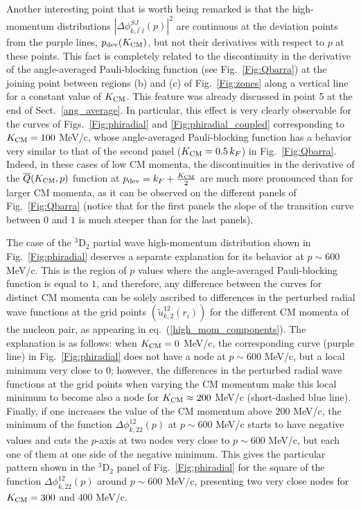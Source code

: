 \documentclass[aps,twocolumn,showpacs,preprintnumbers,amsmath,amssymb,nofootinbib,superscriptaddress,showkeys,noeprint]{revtex4-1}
\begin{document}
Another interesting point that is worth being remarked is that the
high-momentum distributions $\left| \Delta\phi^{SJ}_{k, l^\prime\,
  l}(p) \right|^2$ are continuous at the deviation points from the
purple lines, $p_{\rm dev}(K_{\rm CM})$, but not their derivatives
with respect to $p$ at these points. This fact is completely related
to the discontinuity in the derivative of the angle-averaged
Pauli-blocking function (see Fig.~\ref{Fig:Qbarra}) at the joining
point between regions (b) and (c) of Fig.~\ref{Fig:zones} along a
vertical line for a constant value of $K_{\rm CM}$. This feature was
already discussed in point 5 at the end of Sect.~\ref{ang_average}.
In particular, this effect is very clearly observable for the curves
of Figs.~\ref{Fig:phiradial} and \ref{Fig:phiradial_coupled}
corresponding to $K_{\rm CM}=100$ MeV/c, whose angle-averaged
Pauli-blocking function has a behavior very similar to that of the
second panel ($K_{\rm CM}=0.5\, k_F$) in Fig.~\ref{Fig:Qbarra}.
Indeed, in these cases of low CM momenta, the discontinuities in the
derivative of the $\overline{Q}(K_{\rm CM},p)$ function at $p_{\rm
  dev}=k_F + \frac{K_{\rm CM}}{2}$ are much more pronounced than for
larger CM momenta, as it can be observed on the different panels of
Fig.~\ref{Fig:Qbarra} (notice that for the first panels the slope of
the transition curve between $0$ and $1$ is much steeper than for the
last panels).

The case of the ${}^{3}$D$_2$ partial wave high-momentum distribution
shown in Fig.~\ref{Fig:phiradial} deserves a separate explanation for
its behavior at $p\sim 600$ MeV/c.  This is the region of $p$ values
where the angle-averaged Pauli-blocking function is equal to $1$, and
therefore, any difference between the curves for distinct CM momenta
can be solely ascribed to differences in the perturbed radial wave
functions at the grid points $(\widetilde{u}^{12}_{k,2}(r_i))$ for the
different CM momenta of the nucleon pair, as appearing in
eq.~(\ref{high_mom_components}).  The explanation is as follows: when
$K_{\rm CM}=0$ MeV/c, the corresponding curve (purple line) in
Fig.~\ref{Fig:phiradial} does not have a node at $p\sim 600$ MeV/c,
but a local minimum very close to $0$; however, the differences in the
perturbed radial wave functions at the grid points when varying the CM
momentum make this local minimum to become also a node for $K_{\rm
  CM}\approx 200$ MeV/c (short-dashed blue line).  Finally, if one
increases the value of the CM momentum above $200$ MeV/c, the minimum
of the function $\Delta\phi^{12}_{k,22}(p)$ at $p\sim 600$ MeV/c
starts to have negative values and cuts the $p$-axis at two nodes very
close to $p\sim 600$ MeV/c, but each one of them at one side of the
negative minimum. This gives the particular pattern shown in the
${}^{3}$D$_2$ panel of Fig.~\ref{Fig:phiradial} for the square of the
function $\Delta\phi^{12}_{k,22}(p)$ around $p\sim 600$ MeV/c,
presenting two very close nodes for $K_{\rm CM}=300$ and $400$ MeV/c.
 
\end{document}
